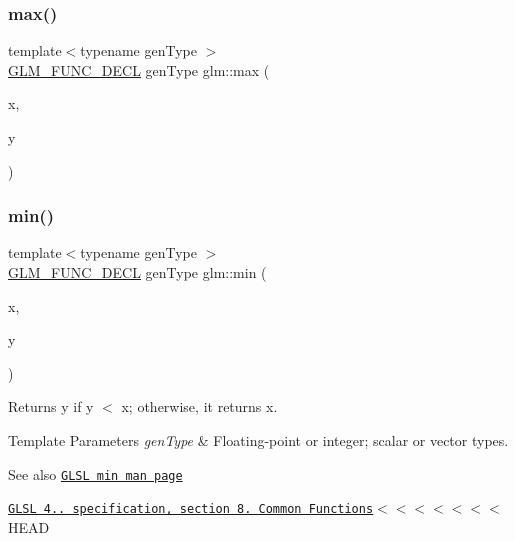 \mbox{\label{group__core__func__common_ga30077cf0de58a7474450fb328ba456d7}} 
\subsubsection{\texorpdfstring{max()}{max()}\hspace{0.1cm}{\footnotesize\ttfamily [2/2]}}
{\footnotesize\ttfamily template$<$typename gen\+Type $>$ \\
\hyperlink{setup_8hpp_ab2d052de21a70539923e9bcbf6e83a51}{G\+L\+M\+\_\+\+F\+U\+N\+C\+\_\+\+D\+E\+CL} gen\+Type glm\+::max (\begin{DoxyParamCaption}\item[{gen\+Type const \&}]{x,  }\item[{typename gen\+Type\+::value\+\_\+type const \&}]{y }\end{DoxyParamCaption})}

\mbox{\label{group__core__func__common_ga3dc90dbd66c9ca1dd5625c93d9c50f02}} 
\subsubsection{\texorpdfstring{min()}{min()}\hspace{0.1cm}{\footnotesize\ttfamily [1/2]}}
{\footnotesize\ttfamily template$<$typename gen\+Type $>$ \\
\hyperlink{setup_8hpp_ab2d052de21a70539923e9bcbf6e83a51}{G\+L\+M\+\_\+\+F\+U\+N\+C\+\_\+\+D\+E\+CL} gen\+Type glm\+::min (\begin{DoxyParamCaption}\item[{gen\+Type const \&}]{x,  }\item[{gen\+Type const \&}]{y }\end{DoxyParamCaption})}

Returns y if y $<$ x; otherwise, it returns x.


\begin{DoxyTemplParams}{Template Parameters}
{\em gen\+Type} & Floating-\/point or integer; scalar or vector types.\\
\hline
\end{DoxyTemplParams}
\begin{DoxySeeAlso}{See also}
\href{http://www.opengl.org/sdk/docs/manglsl/xhtml/min.xml}{\tt G\+L\+SL min man page} 

\href{http://www.opengl.org/registry/doc/GLSLangSpec.4.20.8.pdf}{\tt G\+L\+SL 4.. specification, section 8. Common Functions}$<$$<$$<$$<$$<$$<$$<$ H\+E\+AD 
\end{DoxySeeAlso}



